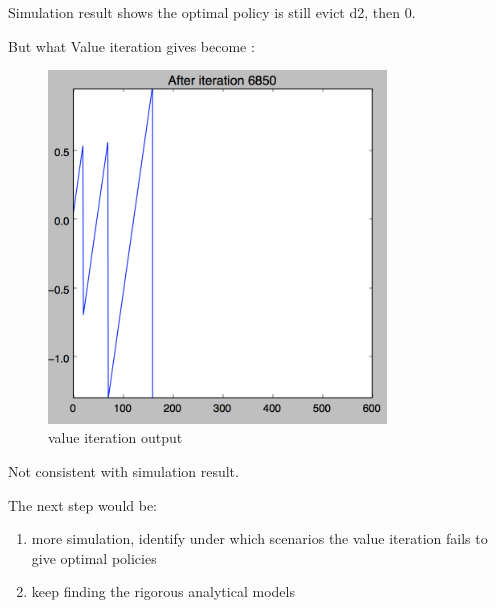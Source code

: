 \documentclass[12pt, letterpaper]{article}
\begin{document}
Simulation result shows the optimal policy is still evict d2, then 0.

But what Value iteration gives become :
\begin{figure}[H]
\centering
\includegraphics[width=0.8\textwidth]{vi-output-2.png}
\caption{value iteration output}
\end{figure}

Not consistent with simulation result.

The next step would be:
\begin{enumerate}
\item more simulation, identify under which scenarios the value iteration fails to give optimal policies
\item keep finding the rigorous analytical models
\end{enumerate}
\end{document}
